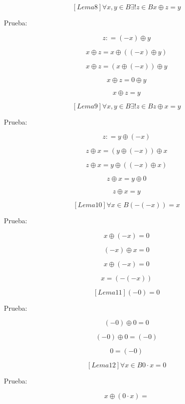 \documentclass[
]{article}
\begin{document}
\begin{enumerate}
\begin{enumerate}
\begin{enumerate}
      \[\left\lbrack {{Lema}8} \right\rbrack\forall x,{y \in B}\exists\mathtt{\mathrm{!}}{z \in B}x \oplus {z = y}\]

      Prueba:

      \[z{: = \left( {- x} \right)} \oplus y\]

      \[x \oplus {z = x} \oplus \left( {\left( {- x} \right) \oplus y} \right)\]

      \[x \oplus {z = \left( {x \oplus \left( {- x} \right)} \right)} \oplus y\]

      \[x \oplus {z = 0} \oplus y\]

      \[x \oplus {z = y}\]

      \[\left\lbrack {{Lema}9} \right\rbrack\forall x,{y \in B}\exists\mathtt{\mathrm{!}}{z \in B}z \oplus {x = y}\]

      Prueba:

      \[z{: = y} \oplus \left( {- x} \right)\]

      \[z \oplus {x = \left( {y \oplus \left( {- x} \right)} \right)} \oplus x\]

      \[z \oplus {x = y} \oplus \left( {\left( {- x} \right) \oplus x} \right)\]

      \[z \oplus {x = y} \oplus 0\]

      \[z \oplus {x = y}\]

      \[\left\lbrack {{Lema}10} \right\rbrack\forall{x \in B}{\left( {- \left( {- x} \right)} \right) = x}\]

      Prueba:

      \[x \oplus {\left( {- x} \right) = 0}\]

      \[\left( {- x} \right) \oplus {x = 0}\]

      \[x \oplus {\left( {- x} \right) = 0}\]

      \[x = \left( {- \left( {- x} \right)} \right)\]

      \[\left\lbrack {{Lema}11} \right\rbrack{\left( {- 0} \right) = 0}\]

      Prueba:

      \[\left( {- 0} \right) \oplus {0 = 0}\]

      \[\left( {- 0} \right) \oplus {0 = \left( {- 0} \right)}\]

      \[0 = \left( {- 0} \right)\]

      \[\left\lbrack {{Lema}12} \right\rbrack\forall{x \in B}{{0 \cdot x} = 0}\]

      Prueba:

      \[x \oplus {\left( {0 \cdot x} \right) =}\]


\end{enumerate}
\end{enumerate}
\end{enumerate}
\end{document}
